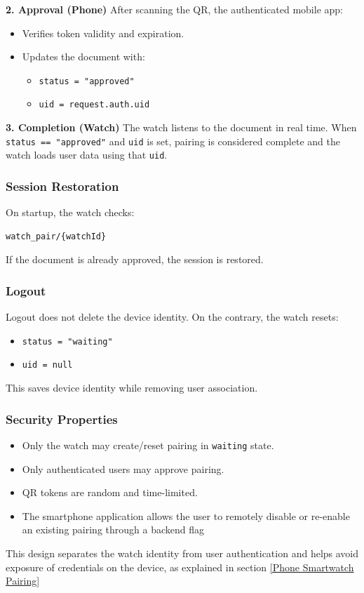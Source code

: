 \textbf{2. Approval (Phone)}  
After scanning the QR, the authenticated mobile app:
\begin{itemize}
    \item Verifies token validity and expiration.
    \item Updates the document with:
    \begin{itemize}
        \item \texttt{status = "approved"}
        \item \texttt{uid = request.auth.uid}
    \end{itemize}
\end{itemize}




\textbf{3. Completion (Watch)}  
The watch listens to the document in real time.  
When \texttt{status == "approved"} and \texttt{uid} is set, pairing is considered complete and the watch loads user data using that \texttt{uid}.
\subsubsection{Session Restoration}
On startup, the watch checks:
\begin{verbatim}
watch_pair/{watchId}
\end{verbatim}
If the document is already approved, the session is restored.
\subsubsection{Logout}
Logout does not delete the device identity. On the contrary, the watch resets:
\begin{itemize}
    \item \texttt{status = "waiting"}
    \item \texttt{uid = null}
\end{itemize}
This saves device identity while removing user association.
\subsubsection{Security Properties}
\begin{itemize}
    \item Only the watch may create/reset pairing in \texttt{waiting} state.
    \item Only authenticated users may approve pairing.
    \item QR tokens are random and time-limited.
    \item The smartphone application allows the user to remotely disable or re-enable an existing pairing through a backend flag
\end{itemize}
This design separates the watch identity from user authentication and helps avoid exposure of credentials on the device, as explained in section \ref{Phone Smartwatch Pairing}






